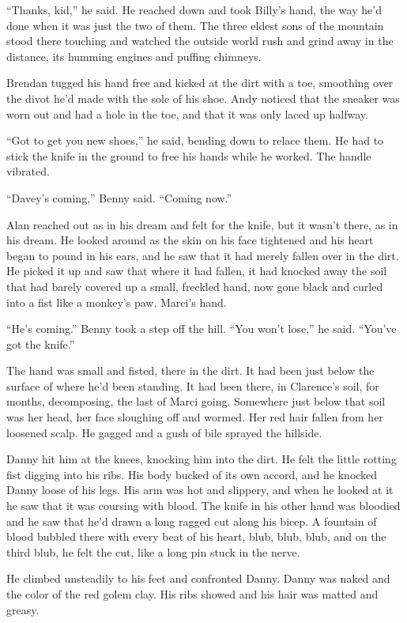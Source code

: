 ``Thanks, kid,'' he said.  He reached down and took Billy's hand, the
way he'd done when it was just the two of them.  The three eldest sons
of the mountain stood there touching and watched the outside world
rush and grind away in the distance, its humming engines and puffing
chimneys.

Brendan tugged his hand free and kicked at the dirt with a toe,
smoothing over the divot he'd made with the sole of his shoe.  Andy
noticed that the sneaker was worn out and had a hole in the toe, and
that it was only laced up halfway.

``Got to get you new shoes,'' he said, bending down to relace them. 
He had to stick the knife in the ground to free his hands while he
worked.  The handle vibrated.

``Davey's coming,'' Benny said.  ``Coming now.''

Alan reached out as in his dream and felt for the knife, but it wasn't
there, as in his dream.  He looked around as the skin on his face
tightened and his heart began to pound in his ears, and he saw that it
had merely fallen over in the dirt.  He picked it up and saw that
where it had fallen, it had knocked away the soil that had barely
covered up a small, freckled hand, now gone black and curled into a
fist like a monkey's paw.  Marci's hand.

``He's coming.'' Benny took a step off the hill.  ``You won't lose,''
he said.  ``You've got the knife.''

The hand was small and fisted, there in the dirt.  It had been just
below the surface of where he'd been standing.  It had been there, in
Clarence's soil, for months, decomposing, the last of Marci going. 
Somewhere just below that soil was her head, her face sloughing off
and wormed.  Her red hair fallen from her loosened scalp.  He gagged
and a gush of bile sprayed the hillside.

Danny hit him at the knees, knocking him into the dirt.  He felt the
little rotting fist digging into his ribs.  His body bucked of its own
accord, and he knocked Danny loose of his legs.  His arm was hot and
slippery, and when he looked at it he saw that it was coursing with
blood.  The knife in his other hand was bloodied and he saw that he'd
drawn a long ragged cut along his bicep.  A fountain of blood bubbled
there with every beat of his heart, blub, blub, blub, and on the third
blub, he felt the cut, like a long pin stuck in the nerve.

He climbed unsteadily to his feet and confronted Danny.  Danny was
naked and the color of the red golem clay.  His ribs showed and his
hair was matted and greasy.

